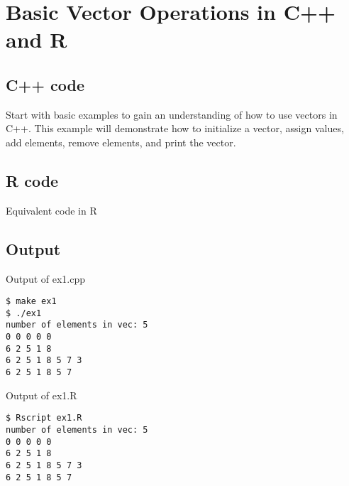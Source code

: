 \chapter{Basic Vector Operations in C++ and R}

\section{C++ code}
Start with basic examples to gain an understanding of how to use vectors in C++. This example will demonstrate how to initialize a vector, assign values, add elements, remove elements, and print the vector.
\lstset{language=C++, showspaces=false, showstringspaces=false}


\section{R code}
Equivalent code in R
\lstset{language=R, showspaces=false, showstringspaces=false}


\section{Output}
Output of ex1.cpp
\begin{verbatim}
$ make ex1
$ ./ex1
number of elements in vec: 5
0 0 0 0 0 
6 2 5 1 8 
6 2 5 1 8 5 7 3 
6 2 5 1 8 5 7 
\end{verbatim}
Output of ex1.R
\begin{verbatim}
$ Rscript ex1.R
number of elements in vec: 5 
0 0 0 0 0 
6 2 5 1 8 
6 2 5 1 8 5 7 3 
6 2 5 1 8 5 7 
\end{verbatim}